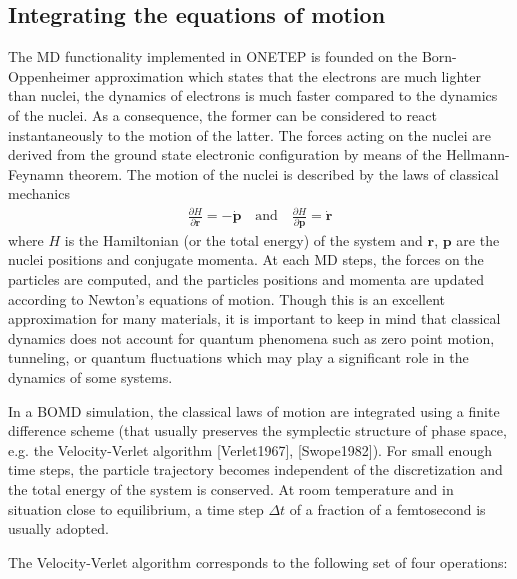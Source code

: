 \documentclass[letterpaper,10pt,english]{sphinxmanual}
\begin{document}
\subsection{Integrating the equations of motion}
\label{\detokenize{BOMD:integrating-the-equations-of-motion}}
The MD functionality implemented in ONETEP is founded on the
Born-Oppenheimer approximation which states that the electrons are much
lighter than nuclei, the dynamics of electrons is much faster compared
to the dynamics of the nuclei. As a consequence, the former can be
considered to react instantaneously to the motion of the latter. The
forces acting on the nuclei are derived from the ground state electronic
configuration by means of the Hellmann-Feynamn theorem. The motion of
the nuclei is described by the laws of classical mechanics
\begin{equation*}
\begin{split}\frac{\partial H}{\partial \mathbf{r}} = -\dot{\mathbf{p}} \ \ \ \mbox{   and   } \ \ \ \frac{\partial H}{\partial \mathbf{p}} = \dot{\mathbf{r}}\end{split}
\end{equation*}
where \(H\) is the Hamiltonian (or the total energy) of the system
and \(\mathbf{r}\), \(\mathbf{p}\) are the nuclei positions and
conjugate momenta. At each MD steps, the forces on the particles are
computed, and the particles positions and momenta are updated according
to Newton’s equations of motion. Though this is an excellent
approximation for many materials, it is important to keep in mind that
classical dynamics does not account for quantum phenomena such as zero
point motion, tunneling, or quantum fluctuations which may play a
significant role in the dynamics of some systems.

In a BOMD simulation, the classical laws of motion are integrated using
a finite difference scheme (that usually preserves the symplectic
structure of phase space, e.g. the Velocity-Verlet
algorithm {[}Verlet1967{]}, {[}Swope1982{]}). For small enough time
steps, the particle trajectory becomes independent of the discretization
and the total energy of the system is conserved. At room temperature and
in situation close to equilibrium, a time step \(\Delta t\) of a
fraction of a femtosecond is usually adopted.

The Velocity-Verlet algorithm corresponds to the following set of four
operations:
\end{document}
